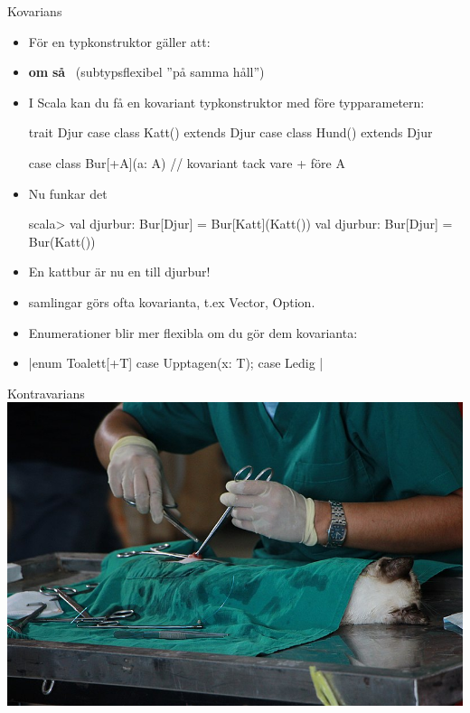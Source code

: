 \begin{Slide}{Kovarians }
\begin{itemize}\SlideFontSmall
\item För en  typkonstruktor  gäller att: 
\item[] \textbf{om}  \textbf{så} ~(subtypsflexibel ''på samma håll'')
\item I Scala kan du få en kovariant typkonstruktor med \code{+} före typparametern:
\begin{Code}
trait Djur
case class Katt() extends Djur
case class Hund() extends Djur

case class Bur[+A](a: A)  // kovariant tack vare + före A
\end{Code}
\pause
\item Nu funkar det \code{:)}
\begin{REPL}
scala> val djurbur: Bur[Djur] = Bur[Katt](Katt())
val djurbur: Bur[Djur] = Bur(Katt())
\end{REPL}
\item En kattbur är nu en  till djurbur!
\pause
\item {} samlingar görs ofta kovarianta, t.ex Vector, Option.
\item Enumerationer blir mer flexibla om du gör dem kovarianta:
\item[] \code|enum Toalett[+T] { case Upptagen(x: T); case Ledig }|
\end{itemize}

\end{Slide}


\ifkompendium\else
\begin{SlideSimple}{Kontravarians}
\hspace*{-1cm}\includegraphics[width=1.2\textwidth]{../img/cat-vet.jpg}  
\end{SlideSimple}
\fi 

